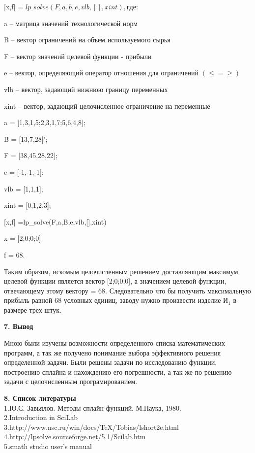 \documentclass[russian,utf8,nocolumxxxi,nocolumnxxxii]{eskdtext}
\begin{document}
[x,f] = $lp\_solve(F,a,b,e,vlb,[],xint), где:$ 

a – матрица значений технологической норм 

B – вектор ограничений на объем используемого сырья 

F – вектор значений целевой функции - прибыли 

e – вектор, определяющий оператор отношения для ограничений $(\leq = \geq)$ 

vlb – вектор, задающий нижнюю границу переменных 

xint – вектор, задающий целочисленное ограничение на переменные 


a = [1,3,1,5;2,3,1,7;5,6,4,8]; 

B = [13,7,28]’; 

F = [38,45,28,22]; 

e = [-1,-1,-1]; 

vlb = [1,1,1]; 

xint = [0,1,2,3]; 

[x,f] =lp\_solve(F,a,B,e,vlb,[],xint) 

x = [2;0;0;0] 

f = 68. 

Таким образом, искомым целочисленным решением доставляющим максимум целевой функции является вектор [2;0;0;0], а значением целевой функции, отвечающему этому вектору = 68. Следовательно что бы получить максимальную прибыль равной 68 условных единиц, заводу нужно произвести изделие И$_1$ в размере трех штук.

\newpage
\begin{center} {\bf7. Вывод} \end{center}
Мною были изучены возможности определенного списка математических программ, а так же получено понимание выбора эффективного решения определенной задачи. Были решены задачи по исследованию функции, построению сплайна и нахождению его погрешности, а так же по решению задачи с целочисленным програмированием.



\newpage
{\bf8. Список литературы}
\\1.Ю.С. Завьялов. Методы сплайн-функций. М.Наука, 1980.
\\2.Introduction in SciLab
\\3.http://www.nsc.ru/win/docs/TeX/Tobias/lshort2e.html
\\4.http://lpsolve.sourceforge.net/5.1/Scilab.htm
\\5.smath studio user’s manual
\end{document}
